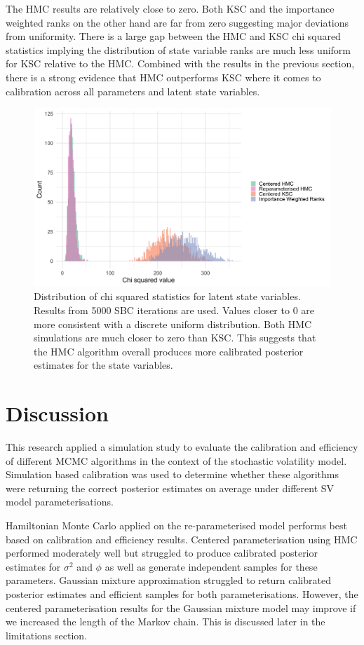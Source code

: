 \documentclass[12pt, a4paper]{article}
\begin{document}
    The HMC results are relatively close to zero. Both KSC and the importance weighted ranks on the other hand are far from zero suggesting major deviations from uniformity. There is a large gap between the HMC and KSC chi squared statistics implying the distribution of state variable ranks are much less uniform for KSC relative to the HMC. Combined with the results in the previous section, there is a strong evidence that HMC outperforms KSC where it comes to calibration across all parameters and latent state variables.

    \begin{figure}[H]
        \centering
        \includegraphics[scale=0.1]{results/dist_chisq_all.png}
        \caption{Distribution of chi squared statistics for latent state variables. Results from 5000 SBC iterations are used. Values closer to 0 are more consistent with a discrete uniform distribution. Both HMC simulations are much closer to zero than KSC. This suggests that the HMC algorithm overall produces more calibrated posterior estimates for the state variables.}
        \label{fig:allchisq}
    \end{figure}

\section{Discussion}
This research applied a simulation study to evaluate the calibration and efficiency of different MCMC algorithms in the context of the stochastic volatility model. Simulation based calibration was used to determine whether these algorithms were returning the correct posterior estimates on average under different SV model parameterisations. 

Hamiltonian Monte Carlo applied on the re-parameterised model performs best based on calibration and efficiency results. Centered parameterisation using HMC performed moderately well but struggled to produce calibrated posterior estimates for $\sigma^2$ and $\phi$ as well as generate independent samples for these parameters. Gaussian mixture approximation struggled to return calibrated posterior estimates and efficient samples for both parameterisations. However, the centered parameterisation results for the Gaussian mixture model may improve if we increased the length of the Markov chain. This is discussed later in the limitations section. 
\end{document}
